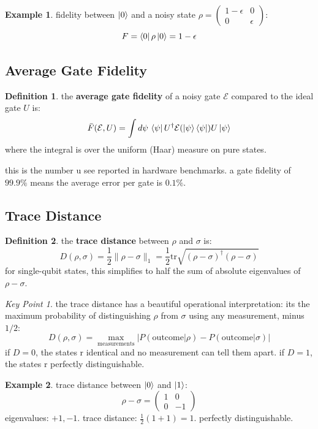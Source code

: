 \documentclass[11pt,a4paper]{article}
\theoremstyle{definition}
\newtheorem{definition}{Definition}[section]
\newtheorem{example}{Example}[section]
\theoremstyle{remark}
\newtheorem*{keypoint}{Key Point}
\begin{document}
\begin{example}
fidelity between $\ket{0}$ and a noisy state $\rho = \begin{pmatrix} 1-\epsilon & 0 \\ 0 & \epsilon \end{pmatrix}$:
\[
F = \bra{0}\rho\ket{0} = 1 - \epsilon
\]
\end{example}

\subsection{Average Gate Fidelity}

\begin{definition}
the \textbf{average gate fidelity} of a noisy gate $\mathcal{E}$ compared to the ideal gate $U$ is:
\[
\bar{F}(\mathcal{E}, U) = \int d\psi \, \bra{\psi} U^\dagger \mathcal{E}(\ket{\psi}\bra{\psi}) U \ket{\psi}
\]
where the integral is over the uniform (Haar) measure on pure states.
\end{definition}

this is the number u see reported in hardware benchmarks. a gate fidelity of $99.9\%$ means the average error per gate is $0.1\%$.

\subsection{Trace Distance}

\begin{definition}
the \textbf{trace distance} between $\rho$ and $\sigma$ is:
\[
\boxed{D(\rho, \sigma) = \frac{1}{2}\|\rho - \sigma\|_1 = \frac{1}{2}\text{tr}\sqrt{(\rho - \sigma)^\dagger(\rho - \sigma)}}
\]
for single-qubit states, this simplifies to half the sum of absolute eigenvalues of $\rho - \sigma$.
\end{definition}

\begin{keypoint}
the trace distance has a beautiful operational interpretation: its the maximum probability of distinguishing $\rho$ from $\sigma$ using any measurement, minus $1/2$:
\[
D(\rho, \sigma) = \max_{\text{measurements}} \left|P(\text{outcome}|\rho) - P(\text{outcome}|\sigma)\right|
\]
if $D = 0$, the states r identical and no measurement can tell them apart. if $D = 1$, the states r perfectly distinguishable.
\end{keypoint}

\begin{example}
trace distance between $\ket{0}$ and $\ket{1}$:
\[
\rho - \sigma = \begin{pmatrix} 1 & 0 \\ 0 & -1 \end{pmatrix}
\]
eigenvalues: $+1, -1$. trace distance: $\frac{1}{2}(1 + 1) = 1$. perfectly distinguishable.
\end{example}
\end{document}
